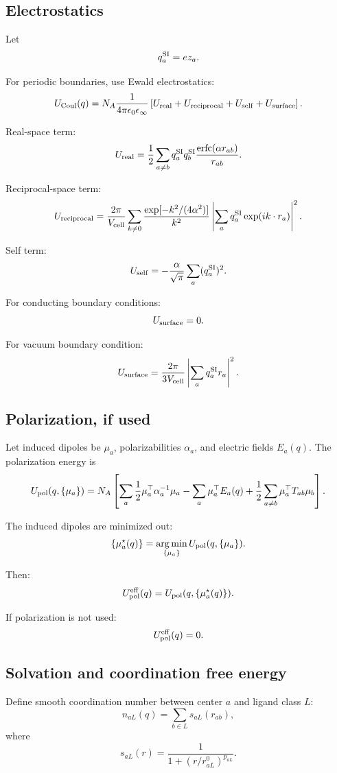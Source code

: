 \documentclass[11pt]{article}
\newcommand{\argmin}{\operatorname*{arg\,min}}
\begin{document}
\subsection{Electrostatics}

Let
\[
q_a^{\rm SI}=e z_a.
\]

For periodic boundaries, use Ewald electrostatics:
\[
U_{\rm Coul}(q)
=
N_A
\frac{1}{4\pi\epsilon_0\epsilon_\infty}
\left[
U_{\rm real}
+
U_{\rm reciprocal}
+
U_{\rm self}
+
U_{\rm surface}
\right].
\]

Real-space term:
\[
U_{\rm real}
=
\frac12
\sum_{a\ne b}
q_a^{\rm SI}q_b^{\rm SI}
\frac{\operatorname{erfc}(\alpha r_{ab})}{r_{ab}}.
\]

Reciprocal-space term:
\[
U_{\rm reciprocal}
=
\frac{2\pi}{V_{\rm cell}}
\sum_{k\ne0}
\frac{\exp[-k^2/(4\alpha^2)]}{k^2}
\left|
\sum_a q_a^{\rm SI}\exp(i k\cdot r_a)
\right|^2.
\]

Self term:
\[
U_{\rm self}
=
-\frac{\alpha}{\sqrt\pi}
\sum_a (q_a^{\rm SI})^2.
\]

For conducting boundary conditions:
\[
U_{\rm surface}=0.
\]

For vacuum boundary condition:
\[
U_{\rm surface}
=
\frac{2\pi}{3V_{\rm cell}}
\left|
\sum_a q_a^{\rm SI}r_a
\right|^2.
\]

\subsection{Polarization, if used}

Let induced dipoles be \(\mu_a\), polarizabilities \(\alpha_a\), and electric
fields \(E_a(q)\). The polarization energy is
\[
U_{\rm pol}(q,\{\mu_a\})
=
N_A
\left[
\sum_a
\frac12
\mu_a^\top\alpha_a^{-1}\mu_a
-
\sum_a \mu_a^\top E_a(q)
+
\frac12
\sum_{a\ne b}\mu_a^\top T_{ab}\mu_b
\right].
\]

The induced dipoles are minimized out:
\[
\{\mu_a^\star(q)\}
=
\argmin_{\{\mu_a\}}U_{\rm pol}(q,\{\mu_a\}).
\]

Then:
\[
U_{\rm pol}^{\rm eff}(q)
=
U_{\rm pol}(q,\{\mu_a^\star(q)\}).
\]

If polarization is not used:
\[
U_{\rm pol}^{\rm eff}(q)=0.
\]

\subsection{Solvation and coordination free energy}

Define smooth coordination number between center \(a\) and ligand class \(L\):
\[
n_{aL}(q)
=
\sum_{b\in L}
s_{aL}(r_{ab}),
\]
where
\[
s_{aL}(r)
=
\frac{1}{1+(r/r_{aL}^0)^{p_{aL}}}.
\]
\end{document}
